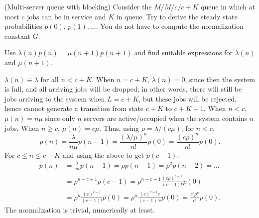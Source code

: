 \begin{exercise}[\faFlask](Multi-server queue with blocking) Consider the
  $M/M/c/c+K$ queue in which at most $c$ jobs can be in service and $K$ in queue. Try to derive the steady state probabilities
  $p(0)$, $p(1), \ldots$. You do not have to compute the normalization
  constant $G$. 
  \begin{hint}
Use $\lambda(n) p(n) = \mu(n+1)p(n+1)$ and
    find suitable expressions for $\lambda(n)$ and $\mu(n+1)$. 
  \end{hint}
  \begin{solution}
    $\lambda(n) \equiv \lambda$ for all $n<c+K$. When $n=c+K$,
    $\lambda(n)=0$, since then the system is full, and all arriving
    jobs will be dropped; in other words, there will still be jobs
    arriving to the system when $L=c+K$, but these jobs will be
    rejected, hence cannot generate a transition from state $c+K$ to
    $c+K+1$.  When $n<c$, $\mu(n)=n \mu$ since only $n$ servers
    are active/occupied when the system contains $n$ jobs. When
    $n\geq c$, $\mu(n) = c \mu$. Thus, using $\rho=\lambda/(c\mu)$, for $n<c$,
     \begin{equation*}
      p(n) = \frac{\lambda}{n\mu} p(n-1) = \frac{(\lambda/\mu)^n}{n!} p(0)=\frac{(c\rho)^n}{n!}p(0).
     \end{equation*}
For $c\leq n\leq c+K$ and using the above to get $p(c-1)$:
 \begin{align*}
 p(n) &= \frac{\lambda}{c\mu} p(n-1) 
= \rho p(n-1) = \rho^2 p(n-2) = \ldots\\
&=\rho^{n-c+1} p(c-1) 
=\rho^{n-c+1} \frac{(c\rho)^{c-1}}{(c-1)!}p(0)\\
&=\rho^{n} \frac{(c)^{c-1}}{(c-1)!}p(0) 
=\rho^{n} \frac{(c)^{c-1}c}{(c-1)!c}p(0) =\frac{c^c \rho^n}{c!} p(0).
 \end{align*}
The normalization is trivial, numerically at least.
  \end{solution}
\end{exercise}


